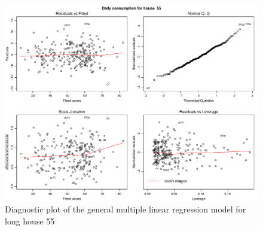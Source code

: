 \begin{figure}
    \centering
    \includegraphics[width=1.\textwidth]{../../../figures/general_lm55L.pdf}
    \caption{Diagnostic plot of the general multiple linear regression model for long house 55}
    \label{fig: general_lm55L}
\end{figure}



